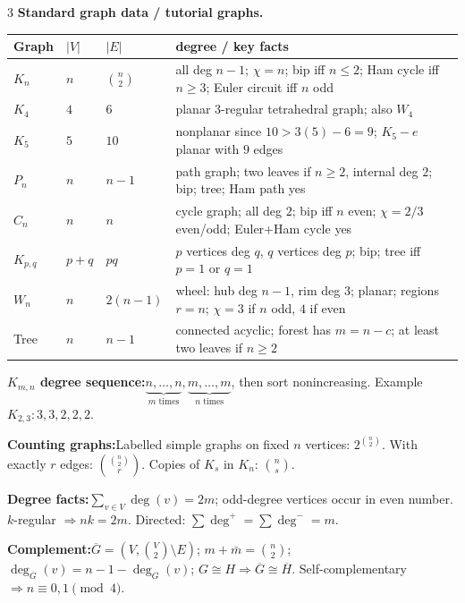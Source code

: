 \documentclass[10pt]{article}
\newenvironment{cheatitems}{\par\vspace{-1pt}}{\par\vspace{-1pt}}
\newcommand{\cheatrow}[2]{\par\noindent\textbf{#1:}\enspace #2\par}
\begin{document}
\begin{multicols}{3}
\vspace{1pt}\noindent\textbf{Standard graph data / tutorial graphs.}\par
\begin{tabular}{@{}p{}p{}p{}p{}@{}}
\toprule
Graph & $|V|$ & $|E|$ & degree / key facts\\
\midrule
$K_n$ & $n$ & $\binom n2$ & all deg $n-1$; $\chi=n$; bip iff $n\le2$; Ham cycle iff $n\ge3$; Euler circuit iff $n$ odd\\
$K_4$ & $4$ & $6$ & planar $3$-regular tetrahedral graph; also $W_4$\\
$K_5$ & $5$ & $10$ & nonplanar since $10>3(5)-6=9$; $K_5-e$ planar with $9$ edges\\
$P_n$ & $n$ & $n-1$ & path graph; two leaves if $n\ge2$, internal deg $2$; bip; tree; Ham path yes\\
$C_n$ & $n$ & $n$ & cycle graph; all deg $2$; bip iff $n$ even; $\chi=2/3$ even/odd; Euler+Ham cycle yes\\
$K_{p,q}$ & $p+q$ & $pq$ & $p$ vertices deg $q$, $q$ vertices deg $p$; bip; tree iff $p=1$ or $q=1$\\
$W_n$ & $n$ & $2(n-1)$ & wheel: hub deg $n-1$, rim deg $3$; planar; regions $r=n$; $\chi=3$ if $n$ odd, $4$ if even\\
Tree & $n$ & $n-1$ & connected acyclic; forest has $m=n-c$; at least two leaves if $n\ge2$\\
\bottomrule
\end{tabular}

\begin{cheatitems}
\cheatrow{$K_{m,n}$ degree sequence}{$\underbrace{n,\ldots,n}_{m\text{ times}},\underbrace{m,\ldots,m}_{n\text{ times}}$, then sort nonincreasing. Example $K_{2,3}: 3,3,2,2,2$.}
\cheatrow{Counting graphs}{Labelled simple graphs on fixed $n$ vertices: $2^{\binom n2}$. With exactly $r$ edges: $\binom{\binom n2}{r}$. Copies of $K_s$ in $K_n$: $\binom ns$.}
\cheatrow{Degree facts}{$\sum_{v\in V}\deg(v)=2m$; odd-degree vertices occur in even number. $k$-regular $\Rightarrow nk=2m$. Directed: $\sum\deg^+=\sum\deg^-=m$.}
\cheatrow{Complement}{$\overline G=(V,\binom V2\setminus E)$; $m+\bar m=\binom n2$; $\deg_{\overline G}(v)=n-1-\deg_G(v)$; $G\cong H\Rightarrow\overline G\cong\overline H$. Self-complementary $\Rightarrow n\equiv0,1\pmod4$.}
\end{cheatitems}


\end{multicols}
\end{document}
